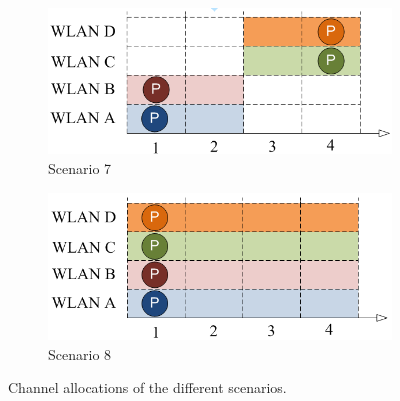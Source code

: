 \documentclass[a4paper]{article}
\begin{document}
\begin{figure}[h]
\begin{subfigure}[b]{0.475\textwidth}
	    \centering 
	    \includegraphics[width=\textwidth]{images/channel_bonding_scenario7.png}
	    \caption[]%
	    {{\small Scenario 7}}    
	    \label{fig:channel_bonding_scenario7}
	  \end{subfigure}
	  \quad
	  \begin{subfigure}[b]{0.475\textwidth}   
	    \centering 
	    \includegraphics[width=\textwidth]{images/channel_bonding_scenario8.png}
	    \caption[]%
	    {{\small Scenario 8}}    
	    \label{fig:channel_bonding_scenario8}
	  \end{subfigure}
	\caption[Channel allocations]
	{\small Channel allocations of the different scenarios.} 
	\label{fig:channel_allocation_3to6}
	\end{figure}
	
\end{document}
